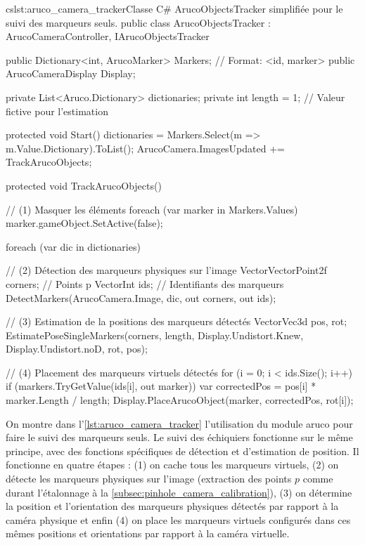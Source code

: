 \begin{listingETS}{cs}{lst:aruco_camera_tracker}{Classe C\# ArucoObjectsTracker simplifiée pour le suivi des marqueurs seuls.}
  public class ArucoObjectsTracker : ArucoCameraController, IArucoObjectsTracker
  {
    public Dictionary<int, ArucoMarker> Markers; // Format: <id, marker>
    public ArucoCameraDisplay Display;

    private List<Aruco.Dictionary> dictionaries;
    private int length = 1; // Valeur fictive pour l'estimation

    protected void Start()
    {
      dictionaries = Markers.Select(m => m.Value.Dictionary).ToList();
      ArucoCamera.ImagesUpdated += TrackArucoObjects;
    }

    protected void TrackArucoObjects()
    {
      // (1) Masquer les éléments
      foreach (var marker in Markers.Values) { marker.gameObject.SetActive(false); }

      foreach (var dic in dictionaries)
      {
        // (2) Détection des marqueurs physiques sur l'image
        VectorVectorPoint2f corners; // Points p
        VectorInt ids; // Identifiants des marqueurs
        DetectMarkers(ArucoCamera.Image, dic, out corners, out ids);
        
        // (3) Estimation de la positions des marqueurs détectés
        VectorVec3d pos, rot;
        EstimatePoseSingleMarkers(corners, length, Display.Undistort.Knew, Display.Undistort.noD, rot, pos);

        // (4) Placement des marqueurs virtuels détectés
        for (i = 0; i < ids.Size(); i++)
        {
          if (markers.TryGetValue(ids[i], out marker))
          {
            var correctedPos = pos[i] * marker.Length / length;
            Display.PlaceArucoObject(marker, correctedPos, rot[i]);
          }
        }
      }
    }
  }
\end{listingETS}

On montre dans l'\autoref{lst:aruco_camera_tracker} l'utilisation du module aruco pour faire le suivi des marqueurs seuls. Le suivi des échiquiers fonctionne sur le même principe, avec des fonctions spécifiques de détection et d'estimation de position. Il fonctionne en quatre étapes : (1) on cache tous les marqueurs virtuels, (2) on détecte les marqueurs physiques sur l'image (extraction des points $p$ comme durant l'étalonnage à la \autoref{subsec:pinhole_camera_calibration}), (3) on détermine la position et l'orientation des marqueurs physiques détectés par rapport à la caméra physique et enfin (4) on place les marqueurs virtuels configurés dans ces mêmes positions et orientations par rapport à la caméra virtuelle.

